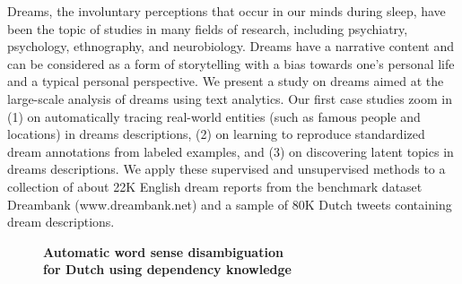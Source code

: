 \documentclass[10pt, a4paper, twopage, headinclude, footinclude, BCOR5mm]{scrartcl}
\begin{document}
\noindent
Dreams, the involuntary perceptions that occur in our minds during sleep, have been the topic of studies in many fields of research, including psychiatry, psychology, ethnography, and neurobiology. Dreams have a narrative content and can be considered as a form of storytelling with a bias towards one's personal life and a typical personal perspective. We present a study on dreams aimed at the large-scale analysis of dreams using text analytics. Our first case studies zoom in (1) on automatically tracing real-world entities (such as famous people and locations) in dreams descriptions, (2) on learning to reproduce standardized dream annotations from labeled examples, and (3) on discovering latent topics in dreams descriptions. We apply these supervised and unsupervised methods to a collection of about 22K English dream reports from the benchmark dataset Dreambank (www.dreambank.net) and a sample of 80K Dutch tweets containing dream descriptions.


\newpage

\begin{figure}[t!]
\centering
\large\textbf{Automatic word sense disambiguation \\ for Dutch using dependency knowledge}
\vspace*{0.5cm}
\end{figure}


        \begin{table}[t!]
    \end{table}
\end{document}
